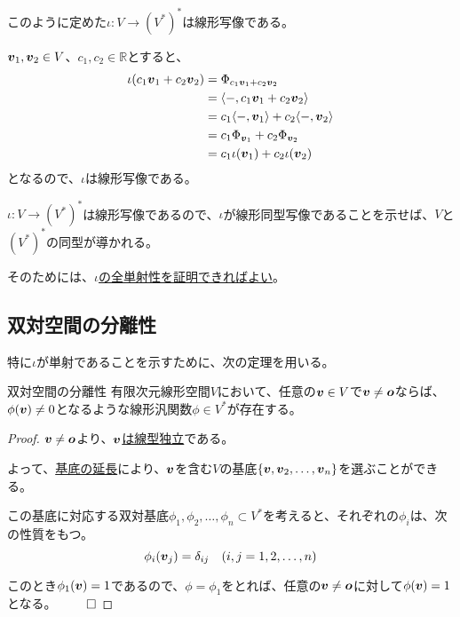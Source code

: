 \documentclass[../../../topic_linear-algebra]{subfiles}
\begin{document}
このように定めた$\iota \colon V \to (V^*)^*$は線形写像である。

\br

\begin{handout}
  $\vb*{v}_1, \vb*{v}_2 \in V$、$c_1, c_2 \in \mathbb{R}$とすると、
  \begin{align*}
    \iota(c_1 \vb*{v}_1 + c_2 \vb*{v}_2) &= \Phi_{c_1 \vb*{v}_1 + c_2 \vb*{v}_2} \\
    &= \langle -, c_1 \vb*{v}_1 + c_2 \vb*{v}_2 \rangle \\
    &= c_1 \langle -, \vb*{v}_1 \rangle + c_2 \langle -, \vb*{v}_2 \rangle \\
    &= c_1 \Phi_{\vb*{v}_1} + c_2 \Phi_{\vb*{v}_2} \\
    &= c_1 \iota(\vb*{v}_1) + c_2 \iota(\vb*{v}_2)
  \end{align*}
  となるので、$\iota$は線形写像である。
\end{handout}

\br

$\iota \colon V \to (V^*)^*$は線形写像であるので、$\iota$が線形同型写像であることを示せば、$V$と$(V^*)^*$の同型が導かれる。

そのためには、\hyperref[def:linear-isomorphism]{$\iota$の全単射性を証明できればよい}。

\subsection{双対空間の分離性}

特に$\iota$が単射であることを示すために、次の定理を用いる。

\begin{theorem}{双対空間の分離性}\label{thm:dual-space-separation}
  有限次元線形空間$V$において、任意の$\vb*{v} \in V$で$\vb*{v} \neq \vb*{o}$ならば、$\phi(\vb*{v}) \neq 0$となるような線形汎関数$\phi \in V^*$が存在する。
\end{theorem}

\begin{proof}
  $\vb*{v} \neq \vb*{o}$より、\hyperref[thm:single-vec-indep-iff-nonzero]{$\vb*{v}$は線型独立}である。
  
  よって、\hyperref[thm:basis-extension]{基底の延長}により、$\vb*{v}$を含む$V$の基底$\{ \vb*{v}, \vb*{v}_2, \dots, \vb*{v}_n \}$を選ぶことができる。
  
  \br
  
  この基底に対応する双対基底${\phi_1, \phi_2, \dots, \phi_n} \subset V^*$を考えると、それぞれの$\phi_i$は、次の性質をもつ。
  \begin{equation*}
    \phi_i(\vb*{v}_j) = \delta_{ij} \quad (i,j=1,2,\dots,n)
  \end{equation*}
  
  このとき$\phi_1(\vb*{v}) = 1$であるので、$\phi = \phi_1$をとれば、任意の$\vb*{v} \neq \vb*{o}$に対して$\phi(\vb*{v}) = 1$となる。 $\qed$
\end{proof}
\end{document}
